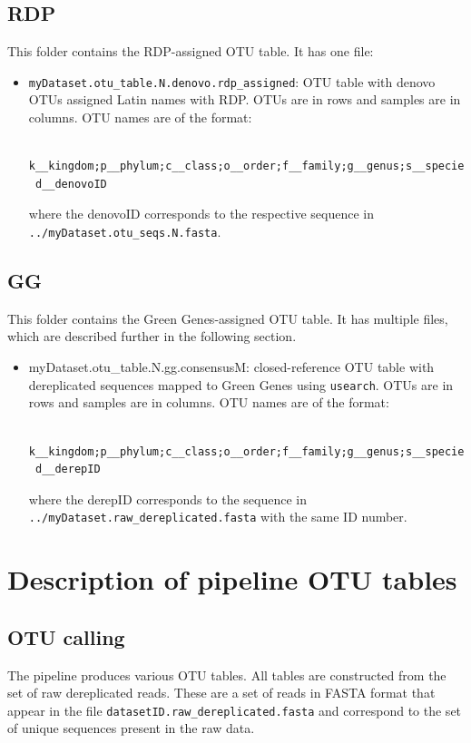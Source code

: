 \documentclass[11pt, oneside]{article}   	%
\begin{document}
\subsection{RDP}
This folder contains the RDP-assigned OTU table. It has one file:
\begin{itemize}
	\item {\tt myDataset.otu\_table.N.denovo.rdp\_assigned}: OTU table with denovo OTUs assigned Latin names with RDP. OTUs are in rows and samples are in columns. OTU names are of the format: \begin{verbatim}
 k__kingdom;p__phylum;c__class;o__order;f__family;g__genus;s__species;
 d__denovoID
\end{verbatim} where the denovoID corresponds to the respective sequence in {\tt ../myDataset.otu\_seqs.N.fasta}.
\end{itemize}

\subsection{GG}
This folder contains the Green Genes-assigned OTU table. It has multiple files, which are described further in the following section.
\begin{itemize}
	\item {myDataset.otu\_table.N.gg.consensusM}: closed-reference OTU table with dereplicated sequences mapped to Green Genes using {\tt usearch}. OTUs are in rows and samples are in columns. OTU names are of the format:
\begin{verbatim}
 k__kingdom;p__phylum;c__class;o__order;f__family;g__genus;s__species;
 d__derepID
\end{verbatim} where the derepID corresponds to the sequence in {\tt ../myDataset.raw\_dereplicated.fasta} with the same ID number.
\end{itemize}

\section{Description of pipeline OTU tables}

\subsection{OTU calling}
The pipeline produces various OTU tables.  All tables are constructed from the set of raw dereplicated reads.  These are a set of reads in FASTA format that appear in the file {\tt datasetID.raw\_dereplicated.fasta} and correspond to the set of unique sequences present in the raw data.  
\end{document}
